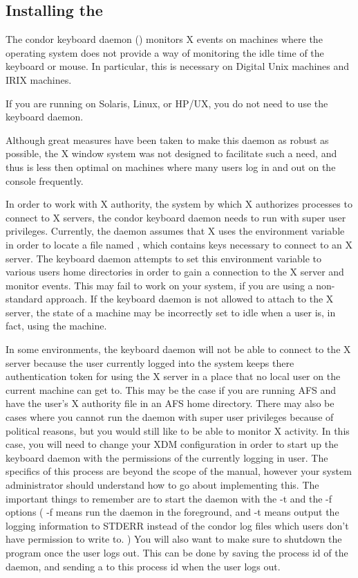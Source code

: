 \subsection{Installing the }
\label{sec:kbdd}

The condor keyboard daemon () monitors X events on
machines where the operating system does not provide a way of
monitoring the idle time of the keyboard or mouse.  In particular,
this is necessary on Digital Unix machines and IRIX machines.  

\Note If you are running on Solaris, Linux, or HP/UX, you do
not need to use the keyboard daemon.

Although great measures have been taken to make this daemon as robust
as possible, the X window system was not designed to facilitate such a
need, and thus is less then optimal on machines where many users log
in and out on the console frequently.

In order to work with X authority, the system by which X authorizes
processes to connect to X servers, the condor keyboard daemon needs to
run with super user privileges.  Currently, the daemon assumes that X
uses the  environment variable in order to locate a file
named , which contains keys necessary to connect to
an X server.  The keyboard daemon attempts to set this environment
variable to various users home directories in order to gain a
connection to the X server and monitor events.  This may fail to work
on your system, if you are using a non-standard approach.  If the
keyboard daemon is not allowed to attach to the X server, the state of
a machine may be incorrectly set to idle when a user is, in fact,
using the machine.

In some environments, the keyboard daemon will not be able to connect to the X
server because the user currently logged into the system keeps there
authentication token for using the X server in a place that no local user on
the current machine can get to.  This may be the case if you are running AFS
and have the user's X authority file in an AFS home directory.  There may also
be cases where you cannot run the daemon with super user privileges because of
political reasons, but you would still like to be able to monitor X activity.
In this case, you will need to change your XDM configuration in order to start
up the keyboard daemon with the permissions of the currently logging in user.
The specifics of this process are beyond the scope of the manual, however your
system administrator should understand how to go about implementing this.  The
important things to remember are to start the daemon with the -t and the -f
options ( -f means run the daemon in the foreground, and -t means output
the logging information to STDERR instead of the condor log files which users
don't have permission to write to. )  You will also want to make sure to
shutdown the program once the user logs out.  This can be done by saving the
process id of the daemon, and sending a
 to this process id when the user logs out.  

